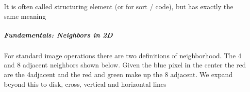 \documentclass[letterpaper,10pt,english]{sphinxmanual}
\begin{document}
\sphinxAtStartPar
It is often called structuring element (or  for sort / code), but has exactly the same meaning


\subparagraph{Fundamentals: Neighbors in 2D}
\label{\detokenize{04-BasicSegmentation_Part2:fundamentals-neighbors-in-2d}}
\sphinxAtStartPar
For standard image operations there are two definitions of neighborhood. The 4 and 8 adjacent neighbors shown below. Given the blue pixel in the center the red are the 4\sphinxhyphen{}adjacent and the red and green make up the 8 adjacent. We expand beyond this to disk, cross, vertical and horizontal lines

\begin{sphinxVerbatim}[commandchars=\\\{\}]
       


 
       \PYG{p}{[}\PYG{p}{[} \PYG{p}{]} \PYG{p}{[} \PYG{p}{]}\PYG{p}{]}  


 
     


 
       


 
      
\end{sphinxVerbatim}
\end{document}
